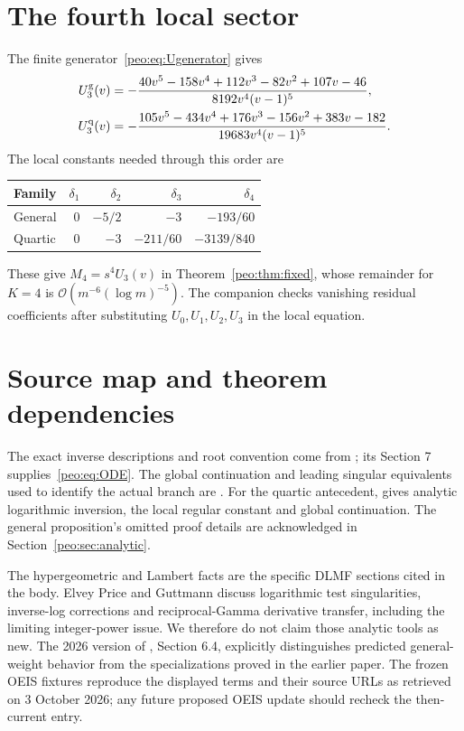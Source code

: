 \documentclass[11pt]{article}
\numberwithin{equation}{section}
\theoremstyle{remark}\newtheorem{remark}[theorem]{Remark}
\newcommand{\Oh}{\mathcal O}
\begin{document}
\appendix
\section{The fourth local sector}\label{peo:app:U}
The finite generator~\eqref{peo:eq:Ugenerator} gives
\begin{align}
 U_3^{\rm g}(v)&=-\frac{40v^5-158v^4+112v^3-82v^2+107v-46}
 {8192v^4(v-1)^5},\\
 U_3^{\rm q}(v)&=-\frac{105v^5-434v^4+176v^3-156v^2+383v-182}
 {19683v^4(v-1)^5}.
\end{align}
The local constants needed through this order are
\begin{center}
\begin{tabular}{@{}lrrrr@{}}\toprule
Family & $\delta_1$ & $\delta_2$ & $\delta_3$ & $\delta_4$\\\midrule
General & $0$ & $-5/2$ & $-3$ & $-193/60$\\
Quartic & $0$ & $-3$ & $-211/60$ & $-3139/840$\\\bottomrule
\end{tabular}
\end{center}
These give $M_4=s^4U_3(v)$ in Theorem~\ref{peo:thm:fixed}, whose remainder for $K=4$ is $\Oh(m^{-6}(\log m)^{-5})$. The companion checks vanishing residual coefficients after substituting $U_0,U_1,U_2,U_3$ in the local equation.

\section{Source map and theorem dependencies}\label{peo:app:sources}
The exact inverse descriptions and root convention come from \cite[Theorems 1.1--1.2 and Section 2]{BMEP}; its Section 7 supplies~\eqref{peo:eq:ODE}. The global continuation and leading singular equivalents used to identify the actual branch are \cite[Propositions 8.2--8.3]{BMEP}. For the quartic antecedent, \cite[Theorem 7.1, equation (53), Proposition 8.4]{BC} gives analytic logarithmic inversion, the local regular constant and global continuation. The general proposition's omitted proof details are acknowledged in Section~\ref{peo:sec:analytic}.

The hypergeometric and Lambert facts are the specific DLMF sections cited in the body. Elvey Price and Guttmann \cite{EPG} discuss logarithmic test singularities, inverse-log corrections and reciprocal-Gamma derivative transfer, including the limiting integer-power issue. We therefore do not claim those analytic tools as new. The 2026 version of \cite{refined}, Section 6.4, explicitly distinguishes predicted general-weight behavior from the specializations proved in the earlier paper. The frozen OEIS fixtures reproduce the displayed terms and their source URLs as retrieved on 3 October 2026; any future proposed OEIS update should recheck the then-current entry.
\end{document}
